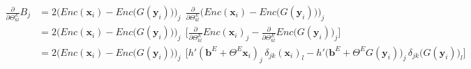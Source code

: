 \vspace{10pt}

\[
\begin{split}
    \frac{\partial}{\partial \Theta^{E}_{kl}} B_{j} 
    & = 2\Big(Enc(\mathbf{x}_{i}) - Enc\big(G(\mathbf{y}_{i})\big)\Big)_{j} \:\: \frac{\partial}{\partial \Theta^{E}_{kl}} \Big(Enc(\mathbf{x}_{i}) - Enc\big(G(\mathbf{y}_{i})\big)\Big)_{j} \\[5pt]
    & = 2\Big(Enc(\mathbf{x}_{i}) - Enc\big(G(\mathbf{y}_{i})\big)\Big)_{j} \:\: \Big[\frac{\partial}{\partial \Theta^{E}_{kl}} Enc(\mathbf{x}_{i})_{j} - \frac{\partial}{\partial \Theta^{E}_{kl}} Enc\big(G(\mathbf{y}_{i})\big)_{j}\Big] \\[5pt]
    & = 2\Big(Enc(\mathbf{x}_{i}) - Enc\big(G(\mathbf{y}_{i})\big)\Big)_{j} \:\: \Big[h'(\mathbf{b}^{E} + \Theta^{E}\mathbf{x}_{i})_{j} \, \delta_{jk}(\mathbf{x}_{i})_{l} - h'\big(\mathbf{b}^{E} + \Theta^{E}G(\mathbf{y}_{i})\big)_{j} \, \delta_{jk}\big(G(\mathbf{y}_{i})\big)_{l}\Big]
\end{split}
\]

\vspace{5pt}

